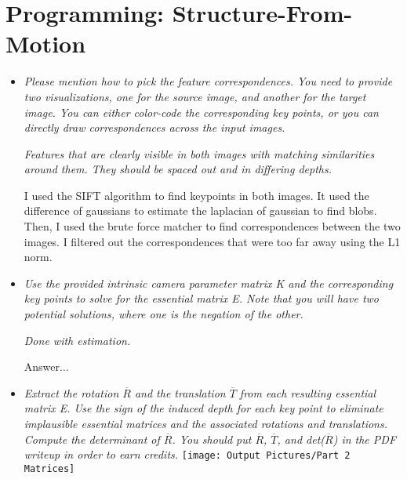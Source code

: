 \documentclass[11pt]{article}
\begin{document}
    \section{Programming: Structure-From-Motion}

    \begin{itemize}
        \item \textit{Please mention how to pick the feature correspondences. You need to provide two visualizations,
            one for the source image, and another for the target image. You can either color-code the corresponding
            key points, or you can directly draw correspondences across the input images.}
        \par
        \textit{\textemdash Features that are clearly visible in both images with matching similarities around them.
        They should be spaced out and in differing depths.}
        \par
        I used the SIFT algorithm to find keypoints in both images. It used the difference of gaussians to estimate
        the laplacian of gaussian to find blobs. Then, I used the brute force matcher to find
        correspondences between the two images. I filtered out the correspondences that were too far away using
        the L1 norm.

        \item \textit{Use the provided intrinsic camera parameter matrix K and the corresponding key points to solve
        for the essential matrix E. Note that you will have two potential solutions, where one is the negation of the
        other.}
        \par
        \textit{\textemdash Done with estimation.}
        \par
        Answer$\ldots$\newline

        \item \textit{Extract the rotation $\overline{R}$ and the translation $\overline{T}$ from each resulting
        essential matrix E. Use the sign of the induced depth for each key point to eliminate implausible essential
        matrices and the associated rotations and translations. Compute the determinant of $\overline{R}$. You should
        put $\overline{R}$, $\overline{T}$, and det($\overline{R}$) in
        the PDF writeup in order to earn credits.}\newline
        \texttt{[image: Output Pictures/Part 2 Matrices]}\newline


\end{itemize}
\end{document}
